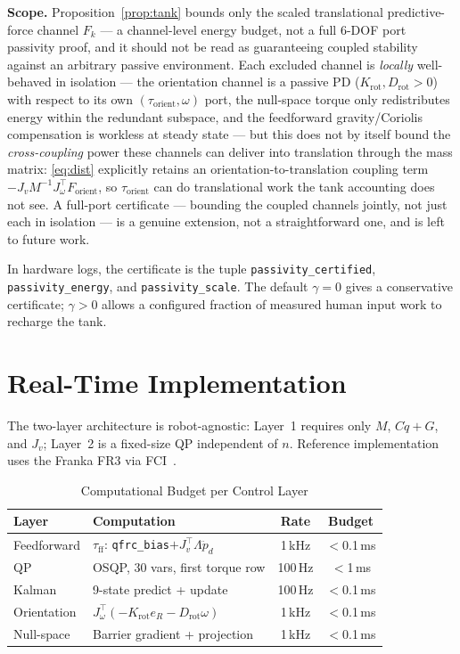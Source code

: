 \documentclass[journal]{IEEEtran}
\begin{document}
\textbf{Scope.} Proposition~\ref{prop:tank} bounds only the scaled
translational predictive-force channel $F_k$ --- a channel-level energy
budget, not a full 6-DOF port passivity proof, and it should not be read
as guaranteeing coupled stability against an arbitrary passive
environment. Each excluded channel is \emph{locally} well-behaved in
isolation --- the orientation channel is a passive PD
($K_{\text{rot}},D_{\text{rot}}>0$) with respect to its own
$(\tau_{\text{orient}},\omega)$ port, the null-space torque only
redistributes energy within the redundant subspace, and the feedforward
gravity/Coriolis compensation is workless at steady state --- but this
does not by itself bound the \emph{cross-coupling} power these channels
can deliver into translation through the mass matrix:
\eqref{eq:dist} explicitly retains an orientation-to-translation coupling
term $-J_vM^{-1}J_\omega^\top F_{\text{orient}}$, so $\tau_{\text{orient}}$
can do translational work the tank accounting does not see. A full-port
certificate --- bounding the coupled channels jointly, not just each in
isolation --- is a genuine extension, not a straightforward one, and is
left to future work.

In hardware logs, the certificate is the tuple
\texttt{passivity\_certified}, \texttt{passivity\_energy}, and
\texttt{passivity\_scale}. The default $\gamma=0$ gives a conservative
certificate; $\gamma>0$ allows a configured fraction of measured human input
work to recharge the tank.

\section{Real-Time Implementation}

The two-layer architecture is robot-agnostic: Layer~1 requires only
$M$, $C\dot{q}+G$, and $J_v$; Layer~2 is a fixed-size QP independent
of $n$.
Reference implementation uses the Franka FR3 via
FCI~\cite{franka2023fr3}.

\begin{table}[!t]
\caption{Computational Budget per Control Layer}
\label{tab:compute}
\renewcommand{\arraystretch}{1.0}
\centering
\setlength{\tabcolsep}{4pt}
\footnotesize
\begin{tabular}{@{}llcc@{}}
\toprule
\textbf{Layer} & \textbf{Computation} & \textbf{Rate} & \textbf{Budget}\\
\midrule
Feedforward & $\tau_{\text{ff}}$: \texttt{qfrc\_bias}$+J_v^\top\Lambda\ddot{p}_d$ & 1\,kHz & $<$0.1\,ms\\
QP          & OSQP, 30 vars, first torque row       & 100\,Hz  & $<$1\,ms\\
Kalman      & 9-state predict + update              & 100\,Hz  & $<$0.1\,ms\\
Orientation & $J_\omega^\top(-K_{\text{rot}}e_R-D_{\text{rot}}\omega)$ & 1\,kHz & $<$0.1\,ms\\
Null-space  & Barrier gradient + projection         & 1\,kHz   & $<$0.1\,ms\\
\bottomrule
\end{tabular}
\end{table}
\end{document}

